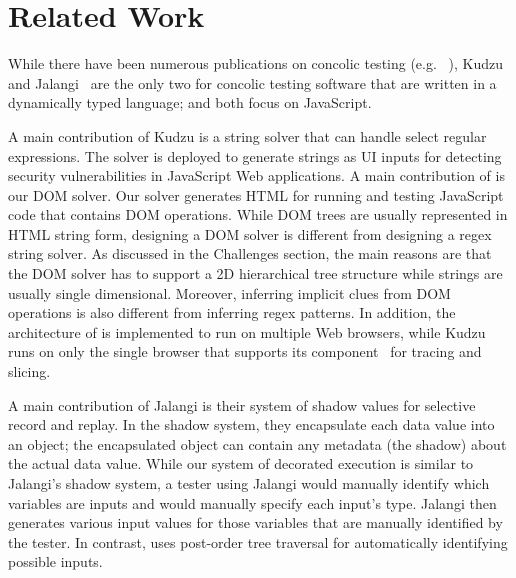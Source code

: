 \section{Related Work}


While there have been numerous publications on concolic testing (e.g. ~\cite{cute, klee, eventConcolic}), 
Kudzu~\cite{kudzu} and Jalangi~\cite{jalangi} are the only two for concolic testing software that are written in a dynamically typed language; and both focus on JavaScript.  

A main contribution of Kudzu is a string solver that can handle select regular expressions.  
The solver is deployed to generate strings as UI inputs for detecting security vulnerabilities in JavaScript Web applications.   
A main contribution of \tool is our DOM solver.  Our solver generates HTML for running and testing JavaScript code that contains DOM operations.    
While DOM trees are usually represented in HTML string form, designing a DOM solver is different from designing a regex string solver.
As discussed in the Challenges section, the main reasons are that the DOM solver has to support a 2D hierarchical tree structure while strings are usually single dimensional.  
Moreover, inferring implicit clues from DOM operations is also different from inferring regex patterns.  
In addition, the architecture of \tool is implemented to run on multiple Web browsers, while Kudzu runs on only the single browser that supports its component~\cite{flax} for tracing and slicing.    

A main contribution of Jalangi is their system of shadow values for selective record and replay.  
In the shadow system, they encapsulate each data value into an object; the encapsulated object can contain any metadata (the shadow) about the actual data value.  
While our system of decorated execution is similar to Jalangi's shadow system, a tester using Jalangi would manually identify which variables are inputs and would manually specify each input's type.  
Jalangi then generates various input values for those variables that are manually identified by the tester.  
In contrast, \tool uses post-order tree traversal for automatically identifying possible inputs.  

